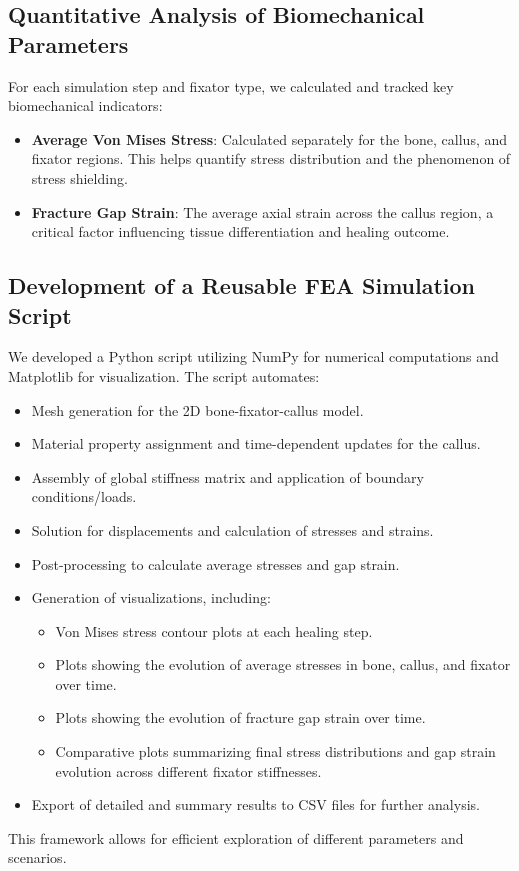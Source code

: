 \documentclass{article}
\begin{document}
\subsection{Quantitative Analysis of Biomechanical Parameters}
For each simulation step and fixator type, we calculated and tracked key biomechanical indicators:
\begin{itemize}
  \item \textbf{Average Von Mises Stress}: Calculated separately for the bone, callus, and fixator regions. This helps quantify stress distribution and the phenomenon of stress shielding.
  \item \textbf{Fracture Gap Strain}: The average axial strain across the callus region, a critical factor influencing tissue differentiation and healing outcome.
\end{itemize}

\subsection{Development of a Reusable FEA Simulation Script}
We developed a Python script utilizing NumPy for numerical computations and Matplotlib for visualization. The script automates:
\begin{itemize}
  \item Mesh generation for the 2D bone-fixator-callus model.
  \item Material property assignment and time-dependent updates for the callus.
  \item Assembly of global stiffness matrix and application of boundary conditions/loads.
  \item Solution for displacements and calculation of stresses and strains.
  \item Post-processing to calculate average stresses and gap strain.
  \item Generation of visualizations, including:
        \begin{itemize}
          \item Von Mises stress contour plots at each healing step.
          \item Plots showing the evolution of average stresses in bone, callus, and fixator over time.
          \item Plots showing the evolution of fracture gap strain over time.
          \item Comparative plots summarizing final stress distributions and gap strain evolution across different fixator stiffnesses.
        \end{itemize}
  \item Export of detailed and summary results to CSV files for further analysis.
\end{itemize}
This framework allows for efficient exploration of different parameters and scenarios.
\end{document}
